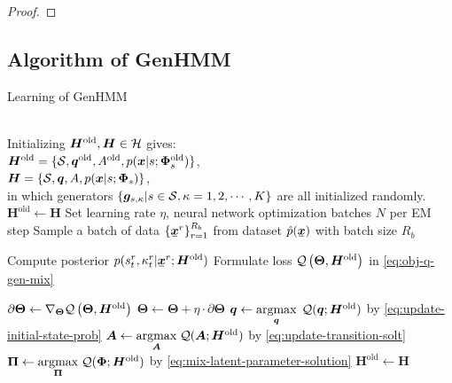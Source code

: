 \begin{proof}
\end{proof}

\subsection{Algorithm of GenHMM}
\begin{algorithm}[H]
  \caption{Learning of GenHMM}\label{algo:genhmm}
  \begin{algorithmic}[1]
    \\
    \STATE Initializing $\bm{H}^{\mathrm{old}}, \bm{H} \in \mathcal{H}$ gives: \\
    $\bm{H}^{\mathrm{old}} = \{\mathcal{S}, \bm{q}^{\mathrm{old}}, A^{\mathrm{old}}, p(\bm{x}|s; \bm{\Phi}_{s}^{\mathrm{old}})\}$, \\
    $\bm{H} = \{\mathcal{S}, \bm{q}, A, p(\bm{x}|s; \bm{\Phi}_{s})\}$, \\
    in which generators $\left\{\bm{g}_{s,\kappa}|s\in \mathcal{S}, \kappa=1,
      2, \cdots, K \right\}$ are all initialized randomly.
    \STATE $\bm{H}^{\mathrm{old}} \gets \bm{H}$
    \STATE Set learning rate $\eta$, neural network optimization batches $N$ per EM step
    \STATE Sample a batch of data $\left\{ \ubmr{x}{r} \right\}_{r=1}^{R_b}$ from dataset $\hat{p}(\ubm{x})$ with batch size $R_b$

    \STATE Compute posterior $p(\smtr{s}{t}{r}, \smtr{\kappa}{t}{r}| \ubmr{x}{r}; \bm{H}^{\mathrm{old}})$  
    \STATE Formulate loss ${\mathcal{Q}}\left({\bm{\Theta}}, {\bm{H}}^{\mathrm{old}}\right)$ in \eqref{eq:obj-q-gen-mix}

    \STATE $\partial{\bm{\Theta}} \gets  \nabla_{\bm{\Theta}} {\mathcal{Q}}\left({\bm{\Theta}},{\bm{H}}^{\mathrm{old}}\right)$
    \STATE $\bm{\Theta} \gets \bm{\Theta} + \eta \cdot \partial{\bm{\Theta}}$
    \ENDFOR
    \STATE $\bm{q} \gets \underset{\bm{q}}{\operatorname{argmax}}\;\, \mathcal{Q}(\bm{q}; \bm{H}^{\mathrm{old}})$ by \eqref{eq:update-initial-state-prob}
    \STATE $\bm{A} \gets \underset{\bm{A}}{\operatorname{argmax}}\;\mathcal{Q}(\bm{A}; \bm{H}^{\mathrm{old}})$ by \eqref{eq:update-transition-solt}
    \STATE $\bm{\Pi} \gets \underset{\bm{\Pi}}{\operatorname{argmax}}\;\mathcal{Q}(\bm{\Phi}; \bm{H}^{\mathrm{old}})$ by \eqref{eq:mix-latent-parameter-solution}
    \STATE $\bm{H}^{\mathrm{old}} \gets \bm{H}$
    \ENDFOR
  \end{algorithmic}
\end{algorithm}

